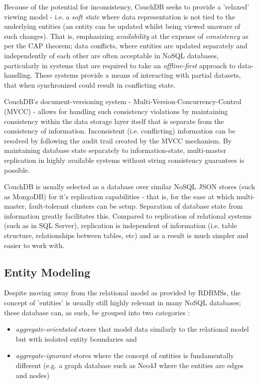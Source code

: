 Because of the potential for inconsistency, CouchDB seeks to provide a 'relaxed' viewing model - i.e. a \textit{soft state} where data representation is not tied to the underlying entities (an entity can be updated whilst being viewed unaware of such changes). That is, emphasizing \textit{availability} at the expense of \textit{consistency} as per the CAP theorem; data conflicts, where entities are updated separately and independently of each other are often acceptable in NoSQL databases, particularly in systems that are required to take an \textit{offline-first} approach to data-handling. These systems provide a means of interacting with partial datasets, that when synchronized could result in conflicting state.

CouchDB's document-versioning system - Multi-Version-Concurrency-Control (MVCC) - allows for handling such consistency violations by maintaining consistency within the data storage layer itself that is separate from the consistency of information. Inconsistent (i.e. conflicting) information can be resolved by following the audit trail created by the MVCC mechanism. By maintaining database state separately to information-state, multi-master replication in highly available systems without string consistency guarantees is possible.

CouchDB is usually selected as a database over similar NoSQL JSON stores (such as MongoDB) for it's replication capabilities - that is, for the ease at which multi-master, fault-tolerant clusters can be setup. Separation of database state from information greatly facilitates this. Compared to replication of relational systems (such as in SQL Server), replication is independent of information (i.e. table structure, relationships between tables, etc) and as a result is much simpler and easier to work with.

\subsection{Entity Modeling}
Despite moving away from the relational model as provided by RDBMSs, the concept of 'entities' is usually still highly relevant in many NoSQL databases; these database can, as such, be grouped into two categories \cite{fowlerAggregate}:

\begin{itemize}
    \item \textit{aggregate-orientated} stores that model data similarly to the relational model but with isolated entity boundaries and
    \item \textit{aggregate-ignorant} stores where the concept of entities is fundamentally different (e.g. a graph database such as Neo4J \cite{sadalage2012} where the entities are edges and nodes)
\end{itemize}

